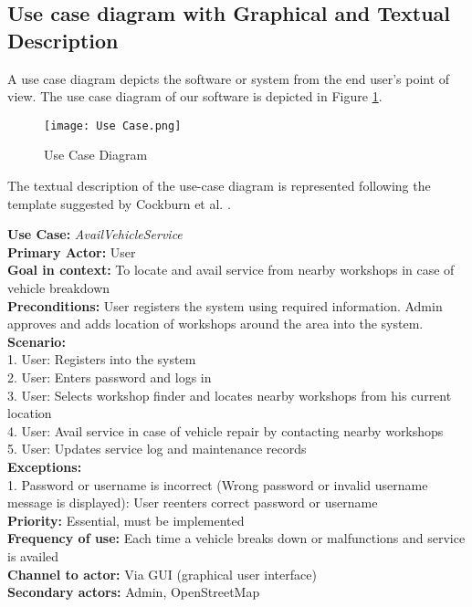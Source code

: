 \documentclass[11pt]{article} %
\begin{document}
	\subsection{Use case diagram with Graphical and Textual Description}
	A use case diagram depicts the software or system from the end user's point of view.
	The use case diagram of our software is depicted in Figure \ref{fig:usecase}.
	\begin{figure}[!hbt]
        \texttt{[image: Use Case.png]}\par 
        \caption{Use Case Diagram}
        \label{fig:usecase}
    \end{figure}

	The textual description of the use-case diagram is represented following the template suggested by Cockburn et al. \cite{usecases}.
	\begin{enumerate}
	\textbf{Use Case:} \emph{AvailVehicleService} \\
	\textbf{Primary Actor:} User\\
	\textbf{Goal in context:} To locate and avail service from nearby workshops in case of vehicle breakdown \\
	\textbf{Preconditions:} User registers the system using required information. Admin approves and adds location of workshops around the area into the system.\\
	\textbf{Scenario:} \\
	1. User: Registers into the system\\
	2. User: Enters password and logs in\\
	3. User: Selects workshop finder and locates nearby workshops from his current location\\
	4. User: Avail service in case of vehicle repair by contacting nearby workshops\\
	5. User: Updates service log and maintenance records\\
	\textbf{Exceptions:}\\
	1. Password or username is incorrect (Wrong password or invalid username message is displayed): User reenters correct password or username\\
	\textbf{Priority:} Essential, must be implemented\\
	\textbf{Frequency of use:} Each time a vehicle breaks down or malfunctions and service is availed\\
	\textbf{Channel to actor:} Via GUI (graphical user interface)\\
	\textbf{Secondary actors:} Admin, OpenStreetMap\\

\end{enumerate}
\end{document}
